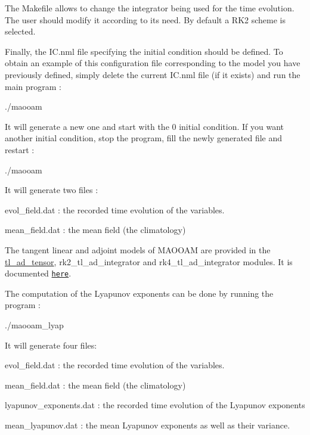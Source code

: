 The Makefile allows to change the integrator being used for the time evolution. The user should modify it according to its need. By default a R\+K2 scheme is selected.

Finally, the I\+C.\+nml file specifying the initial condition should be defined. To obtain an example of this configuration file corresponding to the model you have previously defined, simply delete the current I\+C.\+nml file (if it exists) and run the main program \+: \begin{DoxyVerb}./maooam
\end{DoxyVerb}


It will generate a new one and start with the 0 initial condition. If you want another initial condition, stop the program, fill the newly generated file and restart \+: \begin{DoxyVerb}./maooam
\end{DoxyVerb}


It will generate two files \+:
\begin{DoxyItemize}
\item evol\+\_\+field.\+dat \+: the recorded time evolution of the variables.
\item mean\+\_\+field.\+dat \+: the mean field (the climatology)
\end{DoxyItemize}

The tangent linear and adjoint models of M\+A\+O\+O\+AM are provided in the \hyperlink{namespacetl__ad__tensor}{tl\+\_\+ad\+\_\+tensor}, rk2\+\_\+tl\+\_\+ad\+\_\+integrator and rk4\+\_\+tl\+\_\+ad\+\_\+integrator modules. It is documented \href{./md_doc_tl_ad_doc.html}{\tt here}.

The computation of the Lyapunov exponents can be done by running the program \+: \begin{DoxyVerb}./maooam_lyap
\end{DoxyVerb}


It will generate four files\+:
\begin{DoxyItemize}
\item evol\+\_\+field.\+dat \+: the recorded time evolution of the variables.
\item mean\+\_\+field.\+dat \+: the mean field (the climatology)
\item lyapunov\+\_\+exponents.\+dat \+: the recorded time evolution of the Lyapunov exponents
\item mean\+\_\+lyapunov.\+dat \+: the mean Lyapunov exponents as well as their variance.
\end{DoxyItemize}

